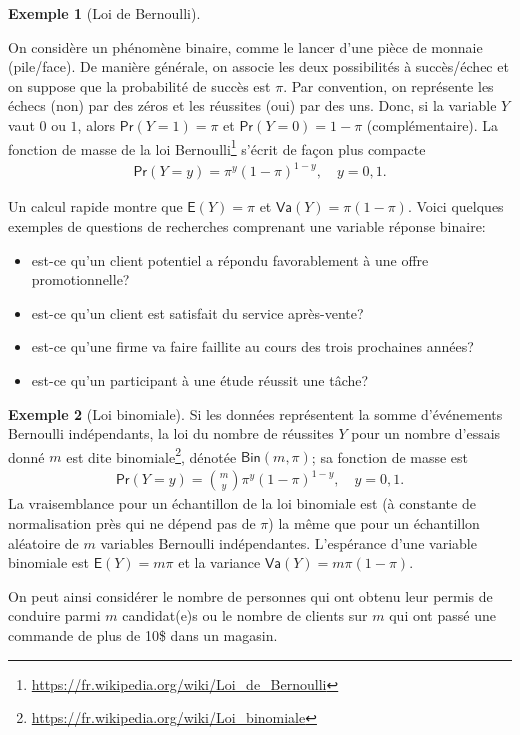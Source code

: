 \documentclass[
  11pt,
  letterpaper,
]{article}
\providecommand{\tightlist}{%
  \setlength{\itemsep}{0pt}\setlength{\parskip}{0pt}}
\renewcommand{\href}[2]{#2\footnote{\url{#1}}}
\theoremstyle{definition}
\theoremstyle{definition}
\newtheorem{example}{Exemple}[section]
\theoremstyle{definition}
\theoremstyle{definition}
\theoremstyle{remark}
\begin{document}
\begin{example}[Loi de Bernoulli]
\protect\hypertarget{exm:loibern}{}\label{exm:loibern}

On considère un phénomène binaire, comme le lancer d'une pièce de monnaie (pile/face). De manière générale, on associe les deux possibilités à succès/échec et on suppose que la probabilité de succès est \(\pi\). Par convention, on représente les échecs (non) par des zéros et les réussites (oui) par des uns. Donc, si la variable \(Y\) vaut \(0\) ou \(1\), alors \(\mathsf{Pr}(Y=1)=\pi\) et \(\mathsf{Pr}(Y=0)=1-\pi\) (complémentaire). La fonction de masse de la \href{https://fr.wikipedia.org/wiki/Loi_de_Bernoulli}{loi Bernoulli} s'écrit de façon plus compacte
\begin{align*}
\mathsf{Pr}(Y=y) = \pi^y (1-\pi)^{1-y}, \quad y=0, 1.
\end{align*}

Un calcul rapide montre que \(\mathsf{E}(Y)=\pi\) et \(\mathsf{Va}(Y)=\pi(1-\pi)\).
Voici quelques exemples de questions de recherches comprenant une variable réponse binaire:

\begin{itemize}
\tightlist
\item
  est-ce qu'un client potentiel a répondu favorablement à une offre
  promotionnelle?
\item
  est-ce qu'un client est satisfait du service après-vente?
\item
  est-ce qu'une firme va faire faillite au cours des trois prochaines années?
\item
  est-ce qu'un participant à une étude réussit une tâche?
\end{itemize}

\end{example}

\begin{example}[Loi binomiale]
\protect\hypertarget{exm:loibinom}{}\label{exm:loibinom}Si les données représentent la somme d'événements Bernoulli indépendants, la loi du nombre de réussites \(Y\) pour un nombre d'essais donné \(m\) est dite \href{https://fr.wikipedia.org/wiki/Loi_binomiale}{binomiale}, dénotée \(\mathsf{Bin}(m, \pi)\); sa fonction de masse est
\begin{align*}
\mathsf{Pr}(Y=y) = \binom{m}{y}\pi^y (1-\pi)^{1-y}, \quad y=0, 1.
\end{align*}
La vraisemblance pour un échantillon de la loi binomiale est (à constante de normalisation près qui ne dépend pas de \(\pi\)) la même que pour un échantillon aléatoire de \(m\) variables Bernoulli indépendantes. L'espérance d'une variable binomiale est \(\mathsf{E}(Y)=m\pi\) et la variance \(\mathsf{Va}(Y)=m\pi(1-\pi)\).

On peut ainsi considérer le nombre de personnes qui ont obtenu leur permis de conduire parmi \(m\) candidat(e)s ou le nombre de clients sur \(m\) qui ont passé une commande de plus de 10\$ dans un magasin.
\end{example}
\end{document}
